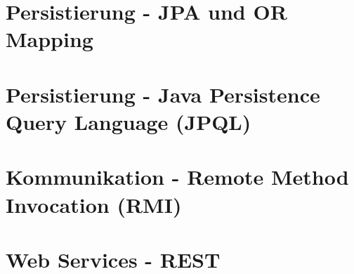 \documentclass[a4paper]{article}
\begin{document}
	\newpage
	\section{Persistierung - JPA und OR Mapping}
	
		
	\newpage
	\section{Persistierung - Java Persistence Query Language (JPQL)}
		
		
	\newpage
	\section{Kommunikation - Remote Method Invocation (RMI)}
	
	
	\newpage
	\section{Web Services - REST}
	
		
		
\end{document}

